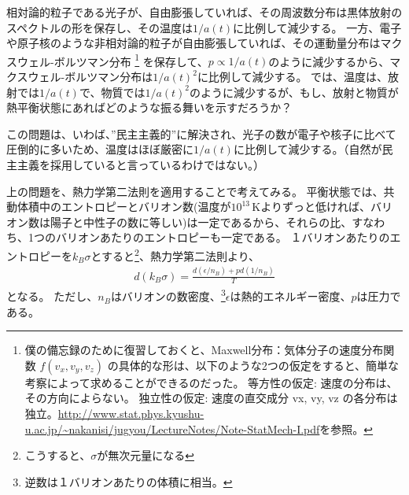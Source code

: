 \documentclass[11pt]{ltjsarticle}
\theoremstyle{plain}
\theoremstyle{break}
\begin{document}
相対論的粒子である光子が、自由膨張していれば、その周波数分布は黒体放射のスペクトルの形を保存し、その温度は$1/a(t)$に比例して減少する。
一方、電子や原子核のような非相対論的粒子が自由膨張していれば、その運動量分布はマクスウェル-ボルツマン分布
\footnote{僕の備忘録のために復習しておくと、Maxwell分布：気体分子の速度分布関数
$f (v_x , v_y , v_z )$ の具体的な形は、以下のような2つの仮定をすると、簡単な考察によって求めることができるのだった。 等方性の仮定: 速度の分布は、その方向によらない。 独立性の仮定: 速度の直交成分 vx, vy, vz の各分布は独立。\url{http://www.stat.phys.kyushu-u.ac.jp/~nakanisi/jugyou/LectureNotes/Note-StatMech-I.pdf}を参照。}
を保存して、$p \propto 1/a(t)$のように減少するから、マクスウェル-ボルツマン分布は$1/a(t)^2$に比例して減少する。
では、温度は、放射では$1/a(t)$で、物質では$1/a(t)^2$のように減少するが、もし、放射と物質が熱平衡状態にあればどのような振る舞いを示すだろうか？

この問題は、いわば、”民主主義的”に解決され、光子の数が電子や核子に比べて圧倒的に多いため、温度はほぼ厳密に$1/a(t)$に比例して減少する。（自然が民主主義を採用していると言っているわけではない。）

上の問題を、熱力学第二法則を適用することで考えてみる。
平衡状態では、共動体積中のエントロピーとバリオン数(温度が$10^{13}\,\mathrm{K}$よりずっと低ければ、バリオン数は陽子と中性子の数に等しい)は一定であるから、それらの比、すなわち、1つのバリオンあたりのエントロピーも一定である。
１バリオンあたりのエントロピーを$k_B \sigma$とすると\footnote{こうすると、$\sigma$が無次元量になる}、熱力学第二法則より、
\begin{align}
  d\left(k_{B} \sigma\right)=\frac{d\left(\epsilon / n_{B}\right)+p d\left(1 / n_{B}\right)}{T} \label{eq:2.2.1}
\end{align}%
となる。
ただし、$n_B$はバリオンの数密度、\footnote{逆数は１バリオンあたりの体積に相当。}$\epsilon$は熱的エネルギー密度、$p$は圧力である。
\end{document}
